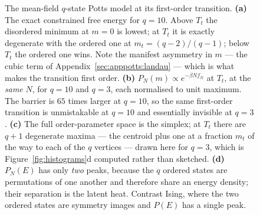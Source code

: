 \documentclass[10pt,a4paper]{article}
\theoremstyle{remark}
\begin{document}
\begin{figure}[htbp]
\caption{The mean-field $q$-state Potts model at its first-order transition.
\textbf{(a)} The exact constrained free energy for $q=10$. Above $T_t$ the
disordered minimum at $m=0$ is lowest; at $T_t$ it is exactly degenerate with the
ordered one at $m_t=(q-2)/(q-1)$; below $T_t$ the ordered one wins. Note the
manifest asymmetry in $m$ --- the cubic term of
Appendix~\ref{sec:apppotts:landau} --- which is what makes the transition first
order. \textbf{(b)} $P_N(m)\propto e^{-\beta Nf_N}$ at $T_t$, at the \emph{same}
$N$, for $q=10$ and $q=3$, each normalised to unit maximum. The barrier is $65$
times larger at $q=10$, so the same first-order transition is unmistakable at
$q=10$ and essentially invisible at $q=3$. \textbf{(c)} The full order-parameter
space is the simplex; at $T_t$ there are $q+1$ degenerate maxima --- the centroid
plus one at a fraction $m_t$ of the way to each of the $q$ vertices --- drawn here
for $q=3$, which is Figure~\ref{fig:histograms}d computed rather than sketched.
\textbf{(d)} $P_N(E)$ has only \emph{two} peaks, because the $q$ ordered states
are permutations of one another and therefore share an energy density; their
separation is the latent heat. Contrast Ising, where the two ordered states are
symmetry images and $P(E)$ has a single peak.}
\label{fig:apppotts1}
\end{figure}
\end{document}
